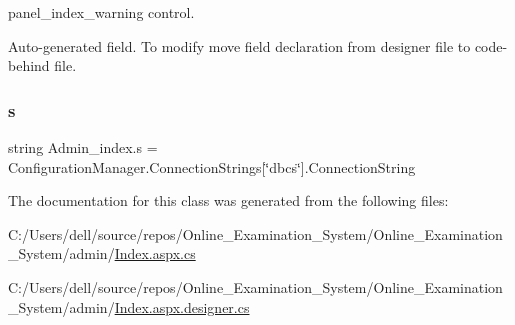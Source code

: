 panel\+\_\+index\+\_\+warning control. 

Auto-\/generated field. To modify move field declaration from designer file to code-\/behind file. \mbox{\label{class_admin__index_a40a549f380046e61ebd3c1bb1d6324df}} 
\subsubsection{\texorpdfstring{s}{s}}
{\footnotesize\ttfamily string Admin\+\_\+index.\+s = Configuration\+Manager.\+Connection\+Strings\mbox{[}\char`\"{}dbcs\char`\"{}\mbox{]}.Connection\+String\hspace{0.3cm}{\ttfamily [private]}}



The documentation for this class was generated from the following files\+:\begin{DoxyCompactItemize}
\item 
C\+:/\+Users/dell/source/repos/\+Online\+\_\+\+Examination\+\_\+\+System/\+Online\+\_\+\+Examination\+\_\+\+System/admin/\mbox{\hyperlink{admin_2_index_8aspx_8cs}{Index.\+aspx.\+cs}}\item 
C\+:/\+Users/dell/source/repos/\+Online\+\_\+\+Examination\+\_\+\+System/\+Online\+\_\+\+Examination\+\_\+\+System/admin/\mbox{\hyperlink{admin_2_index_8aspx_8designer_8cs}{Index.\+aspx.\+designer.\+cs}}\end{DoxyCompactItemize}
